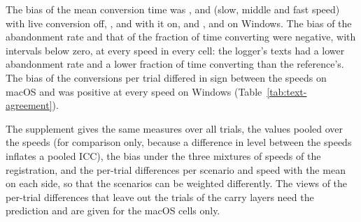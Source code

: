 The bias of the mean conversion time was ,
 and 
(slow, middle and fast speed) with live conversion off, ,
 and  with
it on, and ,  and
 on Windows. The bias of the abandonment rate and that of the
fraction of time converting were negative, with intervals below zero, at every speed in every cell: the logger's texts
had a lower abandonment rate and a lower fraction of time converting than the reference's. The bias of the conversions
per trial differed in sign between the speeds on macOS and was positive at every speed on Windows
(Table~\ref{tab:text-agreement}).

The supplement gives the same measures over all trials, the values pooled over the speeds (for comparison only, because
a difference in level between the speeds inflates a pooled ICC), the bias under the three mixtures of speeds of the
registration, and the per-trial differences per scenario and speed with the mean on each side, so that the scenarios
can be weighted differently. The views of the per-trial differences that leave out the trials of the carry layers need
the prediction and are given for the macOS cells only.




